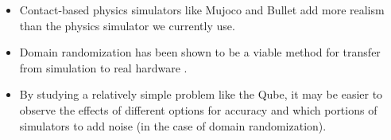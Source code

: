 \begin{itemize}
\item
    Contact-based physics simulators like Mujoco \cite{mujoco} and Bullet \cite{bullet} add more realism than the physics simulator we currently use.
\item
    Domain randomization has been shown to be a viable method for transfer from simulation to real hardware \cite{Domain-Randomization, Learning-Dexterity}.
\item
    By studying a relatively simple problem like the Qube, it may be easier to observe the effects of different options for accuracy and which portions of simulators to add noise (in the case of domain randomization).
\end{itemize}
